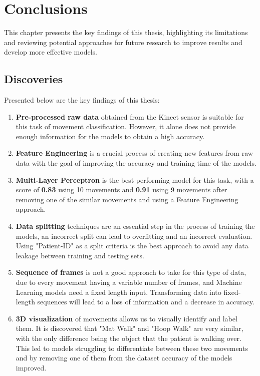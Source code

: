 \hypersetup{colorlinks=true, linkcolor=blue, citecolor=red}

\chapter{Conclusions} \label{chap:conclusions}

    This chapter presents the key findings of this thesis, highlighting its limitations and reviewing potential approaches for future research to improve results and develop more effective models.

    \section{Discoveries}

        Presented below are the key findings of this thesis: 
        \begin{enumerate}
            \item \textbf{Pre-processed raw data} obtained from the Kinect sensor is suitable for this task of movement classification. However, it alone does not provide enough information for the models to obtain a high accuracy.
            \item \textbf{Feature Engineering} is a crucial process of creating new features from raw data with the goal of improving the accuracy and training time of the models.
            \item \textbf{Multi-Layer Perceptron} is the best-performing model for this task, with a score of \textbf{0.83} using 10 movements and \textbf{0.91} using 9 movements after removing one of the similar movements and using a Feature Engineering approach.
            \item \textbf{Data splitting} techniques are an essential step in the process of training the models, an incorrect split can lead to overfitting and an incorrect evaluation. Using "Patient-ID" as a split criteria is the best approach to avoid any data leakage between training and testing sets.
            \item \textbf{Sequence of frames} is not a good approach to take for this type of data, due to every movement having a variable number of frames, and Machine Learning models need a fixed length input. Transforming data into fixed-length sequences will lead to a loss of information and a decrease in accuracy.
            \item \textbf{3D visualization} of movements allows us to visually identify and label them. It is discovered that "Mat Walk" and "Hoop Walk" are very similar, with the only difference being the object that the patient is walking over. This led to models struggling to differentiate between these two movements and by removing one of them from the dataset accuracy of the models improved.
        \end{enumerate}
    
